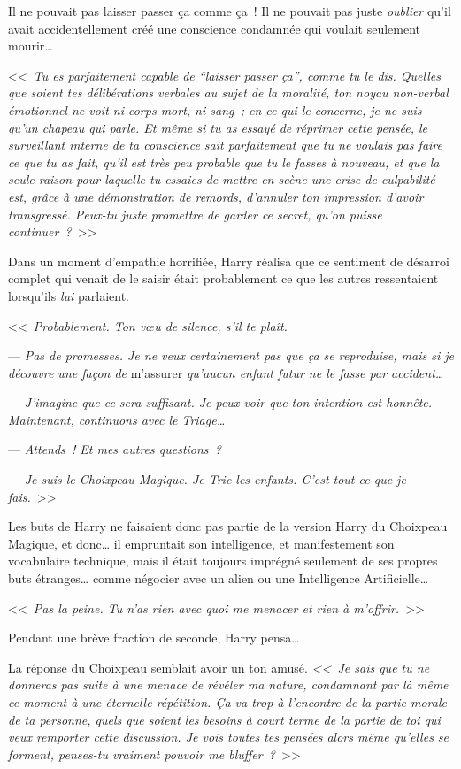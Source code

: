 Il ne pouvait pas laisser passer ça comme ça~! Il ne pouvait pas juste \emph{oublier} qu'il avait accidentellement créé une conscience condamnée qui voulait seulement mourir…

<<~\emph{Tu es parfaitement capable de “laisser passer ça”, comme tu le dis. Quelles que soient tes délibérations verbales au sujet de la moralité, ton noyau non-verbal émotionnel ne voit ni corps mort, ni sang~; en ce qui le concerne, je ne suis qu'un chapeau qui parle. Et même si tu as essayé de réprimer cette pensée, le surveillant interne de ta conscience sait parfaitement que tu ne voulais pas faire ce que tu as fait, qu'il est très peu probable que tu le fasses à nouveau, et que la seule raison pour laquelle tu essaies de mettre en scène une crise de culpabilité est, grâce à une démonstration de remords, d'annuler ton impression d'avoir transgressé. Peux-tu juste promettre de garder ce secret, qu'on puisse continuer~?}~>>

Dans un moment d'empathie horrifiée, Harry réalisa que ce sentiment de désarroi complet qui venait de le saisir était probablement ce que les autres ressentaient lorsqu'ils \emph{lui} parlaient.

<<~\emph{Probablement. Ton vœu de silence, s'il te plaît.}

--- \emph{Pas de promesses. Je ne veux certainement pas que ça se reproduise, mais si je découvre une façon de} m'assurer \emph{qu'aucun enfant futur ne le fasse par accident…}

--- \emph{J'imagine que ce sera suffisant. Je peux voir que ton intention est honnête. Maintenant, continuons avec le Triage…}

--- \emph{Attends~! Et mes autres questions~?}

--- \emph{Je suis le Choixpeau Magique. Je Trie les enfants. C'est tout ce que je fais.}~>>

Les buts de Harry ne faisaient donc pas partie de la version Harry du Choixpeau Magique, et donc… il empruntait son intelligence, et manifestement son vocabulaire technique, mais il était toujours imprégné seulement de ses propres buts étranges… comme négocier avec un alien ou une Intelligence Artificielle…

<<~\emph{Pas la peine. Tu n'as rien avec quoi me menacer et rien à m'offrir.}~>>

Pendant une brève fraction de seconde, Harry pensa…

La réponse du Choixpeau semblait avoir un ton amusé. \emph{<<~Je sais que tu ne donneras pas suite à une menace de révéler ma nature, condamnant par là même ce moment à une éternelle répétition. Ça va trop à l'encontre de la partie morale de ta personne, quels que soient les besoins à court terme de la partie de toi qui veux remporter cette discussion. Je vois toutes tes pensées alors même qu'elles se forment, penses-tu vraiment pouvoir me bluffer~?}~>>

